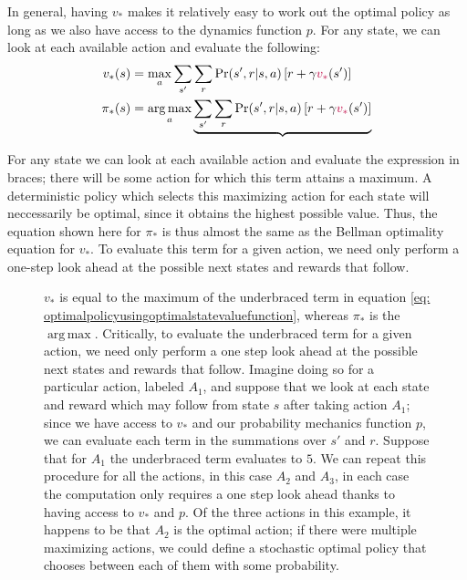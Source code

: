 \documentclass[12pt]{article}
\DeclareMathOperator*{\argmax}{arg\,max}
\begin{document}
In general, having $v_*$ makes it relatively easy to work out the optimal policy as long as we also have access to the dynamics function $p$. For any state, we can look at each available action and evaluate the following:
\begin{align}
  v_*(s) &= \max_a \sum_{s'} \sum_r \Pr(s',r|s,a) \left[ r + \gamma              \color{purple} v_* \color{black}(s')\right] \nonumber \\
  \label{eq: optimalpolicyusingoptimalstatevaluefunction}
  \pi_*(s) &= \argmax_a \underbrace{\sum_{s'} \sum_r \Pr(s',r|s,a)\left[r+\gamma \color{purple} v_* \color{black}(s')\right]}
\end{align}

For any state we can look at each available action and evaluate the expression in braces; there will be some action for which this term attains a maximum. A deterministic policy which selects this maximizing action for each state will neccessarily be optimal, since it obtains the highest possible value. Thus, the equation shown here for $\pi_*$ is thus almost the same as the Bellman optimality equation for $v_*$. To evaluate this term for a given action, we need only perform a one-step look ahead at the possible next states and rewards that follow.

\begin{figure}[h]
  \centering
  \caption{\footnotesize $v_*$ is equal to the maximum of the underbraced term in equation \ref{eq: optimalpolicyusingoptimalstatevaluefunction}, whereas $\pi_*$ is the $\argmax$. Critically, to evaluate the underbraced term for a given action, we need only perform a one step look ahead at the possible next states and rewards that follow. Imagine doing so for a particular action, labeled $A_1$, and suppose that we look at each state and reward which may follow from state $s$ after taking action $A_1$; since we have access to $v_*$ and our probability mechanics function $p$, we can evaluate each term in the summations over $s'$ and $r$. Suppose that for $A_1$ the underbraced term evaluates to $5$. We can repeat this procedure for all the actions, in this case $A_2$ and $A_3$, in each case the computation only requires a one step look ahead thanks to having access to $v_*$ and $p$. Of the three actions in this example, it happens to be that $A_2$ is the optimal action; if there were multiple maximizing actions, we could define a stochastic optimal policy that chooses between each of them with some probability.}
\end{figure}
\end{document}

